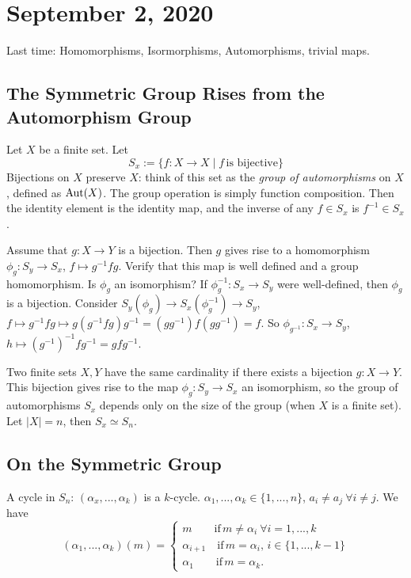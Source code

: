 \section{September 2, 2020}
Last time: Homomorphisms, Isormorphisms, Automorphisms, trivial maps.
\subsection{The Symmetric Group Rises from the Automorphism Group}
\begin{example}
    Let $X$ be a finite set. Let \[
        S_x := \{ f \colon X \to X  \mid f \, \text{is bijective}\} 
    \]
    Bijections on $X$ preserve $X$: think of this set as the \emph{group of automorphisms} on $X$, defined as $\operatorname{Aut}(X)$. The group operation is simply function composition. Then the identity element is the identity map, and the inverse of any $f\in S_x$ is $f^{-1}\in S_x$.
\end{example}
Assume that $ g \colon X \to Y$ is a bijection. Then $g$ gives rise to a homomorphism $ \phi_g \colon S_y \to S_x$, $f \mapsto g^{-1}fg$. Verify that this map is well defined and a group homomorphism. Is $\phi_g$ an isomorphism? If $\phi_g^{-1} \colon S_x \to S_y$ were well-defined, then $\phi_g$ is a bijection. Consider $S_y (\phi_g) \to S_x (\phi_g^{-1}) \to S_y$, $f \mapsto g^{-1}fg \mapsto g(g^{-1}fg)g^{-1}=(gg^{-1})f(gg^{-1})=f$. So $\phi_{g^{-1}} \colon S_{x} \to S_{y}$, $h \mapsto (g^{-1})^{-1}fg^{-1}=gfg^{-1}$.

\begin{conclusion}
    Two finite sets $X,Y$ have the same cardinality if there exists a bijection $ g \colon X \to Y$. This bijection gives rise to the map $ \phi_g \colon S_y \to S_x$ an isomorphism, so the group of automorphisms $S_x$ depends only on the size of the group (when $X$ is a finite set). Let $|X|=n$, then $S_x \simeq S_n$.
\end{conclusion}

\subsection{On the Symmetric Group}
A cycle in $S_n$: $(\alpha_x , ... , \alpha_k)$ is a $k$-cycle. $\alpha_1 ,...,\alpha_k \in \{1, ...,n\} $, $a_i \neq a_j \ \forall i \neq j$. We have  
\begin{equation*}
    (\alpha_1,...,\alpha_k)(m) = 
\begin{cases}
    m \qquad \mbox{if}\, m \neq \alpha_i \ \forall i=1,...,k\\
    \alpha_{i+1} \quad \mbox{if} \, m=\alpha_i, \, i\in \{1,...,k-1\} \\
    \alpha_1 \qquad \mbox{if} \, m=\alpha_k.

\end{cases}
\end{equation*}

